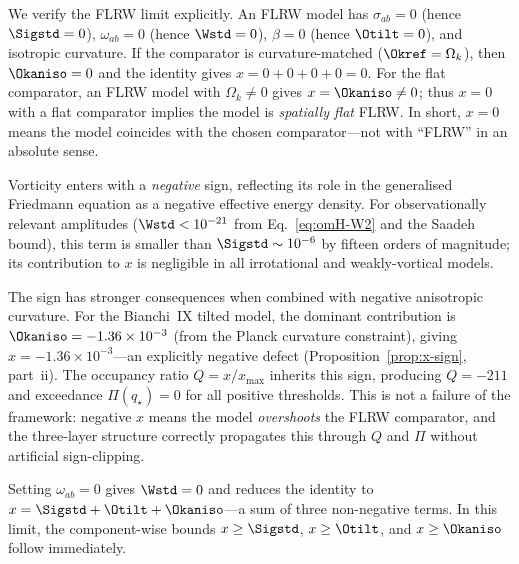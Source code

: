 \begin{remark}\label{rem:FLRW-limit}
We verify the FLRW limit explicitly.  An FLRW model has
$\sigma_{ab} = 0$ (hence $\Sigstd = 0$),
$\omega_{ab} = 0$ (hence $\Wstd = 0$),
$\beta = 0$ (hence $\Otilt = 0$), and isotropic curvature.
If the comparator is curvature-matched ($\Okref = \Omega_k$),
then $\Okaniso = 0$ and the identity gives
$x = 0 + 0 + 0 + 0 = 0$.
For the flat comparator, an FLRW model with $\Omega_k \neq 0$
gives $x = \Okaniso \neq 0$; thus $x = 0$ with a flat
comparator implies the model is \emph{spatially flat} FLRW.
In short, $x = 0$ means the model coincides with the chosen
comparator---not with ``FLRW'' in an absolute sense.
\end{remark}

\begin{remark}
\label{rem:vort-sign}
Vorticity enters with a \emph{negative} sign, reflecting its
role in the generalised Friedmann equation as a negative
effective energy density.  For observationally relevant
amplitudes ($\Wstd < 10^{-21}$ from
Eq.~\eqref{eq:omH-W2} and the Saadeh bound), this term is
smaller than $\Sigstd \sim 10^{-6}$ by fifteen orders of
magnitude; its contribution to $x$ is negligible in all
irrotational and weakly-vortical models.

The sign has stronger consequences when combined with negative
anisotropic curvature.  For the Bianchi~IX tilted model, the
dominant contribution is $\Okaniso = -1.36 \times 10^{-3}$
(from the Planck curvature constraint), giving $x = -1.36
\times 10^{-3}$---an explicitly negative defect
(Proposition~\ref{prop:x-sign}, part~ii).  The occupancy ratio
$Q = x / x_{\max}$ inherits this sign, producing $Q = -211$
and exceedance $\Pi(q_\star) = 0$ for all positive thresholds.
This is not a failure of the framework: negative $x$ means the
model \emph{overshoots} the FLRW comparator, and the
three-layer structure correctly propagates this through $Q$ and
$\Pi$ without artificial sign-clipping.
\end{remark}

\begin{remark}\label{rem:irrot}
Setting $\omega_{ab} = 0$ gives $\Wstd = 0$ and reduces the
identity to $x = \Sigstd + \Otilt + \Okaniso$---a sum of three
non-negative terms.  In this limit, the component-wise bounds
$x \geq \Sigstd$, $x \geq \Otilt$, and $x \geq \Okaniso$
follow immediately.
\end{remark}

